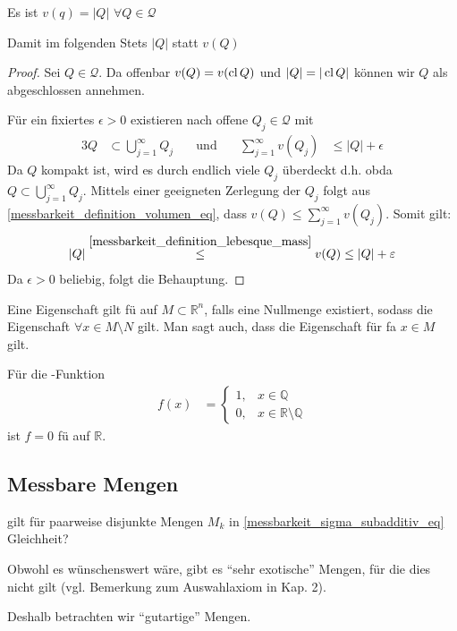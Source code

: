 \begin{conclusion}
	Es ist $v(q) = \vert Q\vert$ $\forall Q\in\mathcal{Q}$
	
	Damit im folgenden Stets $\vert Q\vert$ statt $v(Q)$
\end{conclusion}
\begin{proof}
	Sei $Q\in\mathcal{Q}$. Da offenbar $v(Q) = v(\cl Q)$ und $\vert Q\vert = \vert \cl Q\vert$ können wir $Q$ als abgeschlossen annehmen.
	
	Für ein fixiertes $\epsilon > 0$ existieren nach  offene $Q_j\in\mathcal{Q}$ mit \begin{alignat*}{3}
		Q&\subset\bigcup_{j=1}^\infty Q_j &\quad\text{und}\quad& \sum_{j=1}^\infty v(Q_j) &\le \vert Q \vert + \epsilon
	\end{alignat*}
	Da $Q$ kompakt ist, wird es durch endlich viele $Q_j$ überdeckt d.h. \gls{obda} $Q\subset\bigcup_{j=1}^\infty Q_j$. Mittels einer geeigneten Zerlegung der $Q_j$ folgt aus \eqref{messbarkeit_definition_volumen_eq}, dass $v(Q)\le \sum_{j=1}^\infty v(Q_j)$. Somit gilt: \begin{align*}
		\vert Q \vert \overset{\eqref{messbarkeit_definition_lebesque_mass}}{\le} v(Q) \le \vert Q \vert + \epsilon
	\end{align*}
	Da $\epsilon > 0$ beliebig, folgt die Behauptung.
\end{proof}

\begin{*definition}
	Eine Eigenschaft gilt \gls{fü} auf $M\subset\mathbb{R}^n$, falls eine Nullmenge existiert, sodass die Eigenschaft $\forall x\in M\setminus N$ gilt. Man sagt auch, dass die Eigenschaft für \gls{fa} $x\in M$ gilt.
\end{*definition}

\begin{example}
	Für die -Funktion \begin{align*}
		f(x) &=\begin{cases}
			1, &x\in\mathbb{Q} \\ 0,&x\in\mathbb{R}\setminus\mathbb{Q}
		\end{cases}
	\end{align*}
	ist $f=0$ \gls{fü} auf $\mathbb{R}$.
\end{example}

\subsection{Messbare Mengen}
\begin{underlinedenvironment}[Frage]
	gilt für paarweise disjunkte Mengen $M_k$ in  \eqref{messbarkeit_sigma_subadditiv_eq} Gleichheit?
	
	Obwohl es wünschenswert wäre, gibt es "`sehr exotische"' Mengen, für die dies nicht gilt (vgl. Bemerkung zum Auswahlaxiom in Kap. 2).
	
	Deshalb betrachten wir "`gutartige"' Mengen.
\end{underlinedenvironment}

